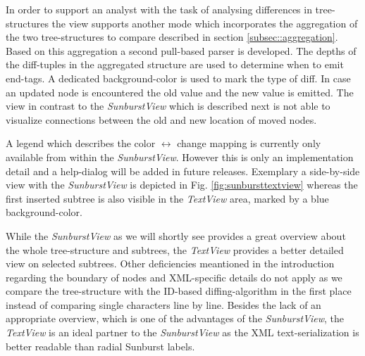 \begin{itemize}
In order to support an analyst with the task of analysing differences in tree-structures the view supports another mode which incorporates the aggregation of the two tree-structures to compare described in section \ref{subsec::aggregation}. Based on this aggregation a second pull-based parser is developed. The depths of the diff-tuples in the aggregated structure are used to determine when to emit end-tags. A dedicated background-color is used to mark the type of diff. In case an updated node is encountered the old value and the new value is emitted. The view in contrast to the \emph{SunburstView} which is described next is not able to visualize connections between the old and new location of moved nodes. %

A legend which describes the color $\leftrightarrow$ change mapping is currently only available from within the \emph{SunburstView}. However this is only an implementation detail and a help-dialog will be added in future releases. Exemplary a side-by-side view with the \emph{SunburstView} is depicted in Fig. \ref{fig:sunbursttextview} whereas the first inserted subtree is also visible in the \emph{TextView} area, marked by a blue background-color. 

While the \emph{SunburstView} as we will shortly see provides a great overview about the whole tree-structure and subtrees, the \emph{TextView} provides a better detailed view on selected subtrees. Other deficiencies meantioned in the introduction regarding the boundary of nodes and XML-specific details do not apply as we compare the tree-structure with the ID-based diffing-algorithm in the first place instead of comparing single characters line by line. Besides the lack of an appropriate overview, which is one of the advantages of the \emph{SunburstView}, the \emph{TextView} is an ideal partner to the \emph{SunburstView} as the XML text-serialization is better readable than radial Sunburst labels.


\end{itemize}
